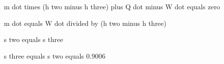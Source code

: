 m dot times (h two minus h three) plus Q dot minus W dot equals zero  

m dot equals W dot divided by (h two minus h three)  

s two equals s three  

s three equals s two equals 0.9006